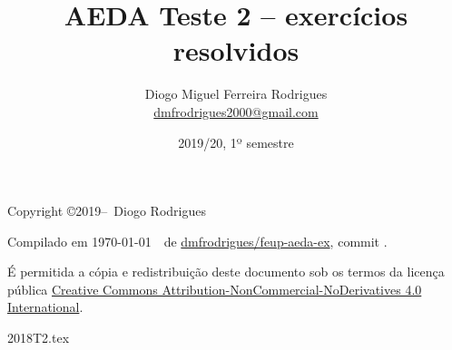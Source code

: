 \documentclass{aeda_test}
\title{AEDA Teste 2 -- exercícios resolvidos}
\author{Diogo Miguel Ferreira Rodrigues \\ \href{mailto:dmfrodrigues2000@gmail.com}{dmfrodrigues2000@gmail.com}}
\date{2019/20, 1º semestre}
\begin{document}
\maketitle
\begin{secondpage}
    Copyright \copyright 2019--\the\year\ Diogo Rodrigues\par
    \par
    \immediate{}
    Compilado em \today~\currenttime~de \href{https://github.com/dmfrodrigues/feup-aeda-ex}{dmfrodrigues/feup-aeda-ex}, commit \unskip.\par
    É permitida a cópia e redistribuição deste documento sob os termos da licença pública
    \href{https://creativecommons.org/licenses/by-nc-nd/4.0/}{Creative Commons Attribution-NonCommercial-NoDerivatives 4.0 International}.
\end{secondpage}
\frontmatter
\tableofcontents
\mainmatter
{2018T2.tex}
\end{document}
